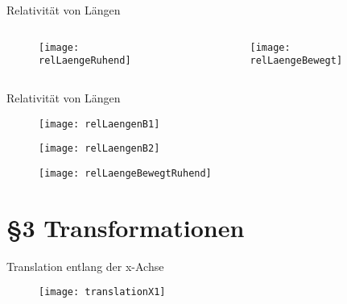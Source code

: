 \documentclass[]{beamer}%
\begin{document}
\begin{frame}{Relativität von Längen}
    \begin{columns}
        \begin{column}{0.5\textwidth}
            \begin{figure}[h]
                \centering
                \texttt{[image: relLaengeRuhend]}
            \end{figure}
        \end{column}
        \begin{column}{0.5\textwidth}
            \begin{figure}[h]
                \centering
                \texttt{[image: relLaengeBewegt]}
            \end{figure}
        \end{column}
    \end{columns}
\end{frame}

\begin{frame}{Relativität von Längen}
    \begin{figure}[h]
        \centering
        \texttt{[image: relLaengenB1]}
    \end{figure}
    \vspace{-10pt}
    \begin{figure}[h]
        \centering
        \texttt{[image: relLaengenB2]}
        \caption{\cite{Einstein1905}}
    \end{figure}
    \begin{figure}[h]
        \centering
        \texttt{[image: relLaengeBewegtRuhend]}
    \end{figure}
\end{frame}

\section{§3 Transformationen}
\begin{frame}{Translation entlang der x-Achse}
    \begin{figure}[h]
        \centering
        \texttt{[image: translationX1]}
    \end{figure}
\end{frame}
\end{document}
